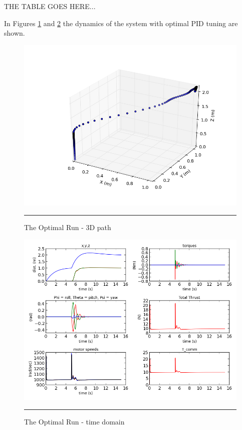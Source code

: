 {\color{red} THE TABLE GOES HERE... }

In Figures \ref{fig:optimal run 3D path} and \ref{fig:optimal run time domain} the dynamics of the system with optimal PID tuning are shown. 

\begin{figure}[htbp]
	\centering
		\includegraphics[width=\textwidth]{Figures/optimal_run_3D_path.png}
		\rule{35em}{0.5pt}
	\caption[optimal run 3D path]{The Optimal Run - 3D path}
	\label{fig:optimal run 3D path}
\end{figure}


\begin{figure}[htbp]
	\centering
		\includegraphics[width=\textwidth]{Figures/optimal_run_time_domain.png}
		\rule{35em}{0.5pt}
	\caption[optimal run time domain]{The Optimal Run - time domain}
	\label{fig:optimal run time domain}
\end{figure}


